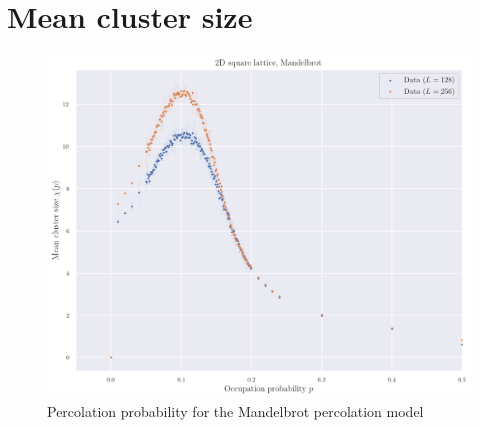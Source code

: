 \section{Mean cluster size}


\begin{figure}[H]
  \includegraphics[width=\linewidth]{Images/simm_mean_cluster_size_1.png}
  \caption{Percolation probability for the Mandelbrot percolation model}
  \label{fig:simm_mean_cluster_size_1}
\end{figure}


